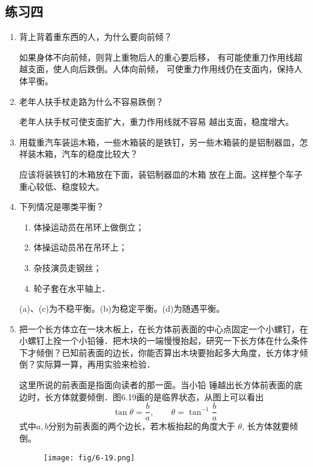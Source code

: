 \subsection{练习四}
\begin{enumerate}
    \item 背上背着重东西的人，为什么要向前倾？


    \begin{solution}
        如果身体不向前倾，则背上重物后人的重心要后移，
        有可能使重刀作用线超越支面，使人向后跌倒。人体向前倾，
        可使重力作用线仍在支面内，保持人体平衡。
    \end{solution}
    \item 老年人扶手杖走路为什么不容易跌倒？


    \begin{solution}
        老年人扶手杖可使支面扩大，重力作用线就不容易
        越出支面，稳度增大。
    \end{solution}
    \item 用载重汽车装运木箱，一些木箱装的是铁钉，另一些木箱装的是铝制器皿，怎祥装木箱，汽车的稳度比较大？


    \begin{solution}
        应该将装铁钉的木箱放在下面，装铝制器皿的木箱
        放在上面。这样整个车子重心较低、稳度较大。
    \end{solution}
    \item 下列情况是哪类平衡？
    \begin{enumerate}
        \item 体操运动员在吊环上做倒立；
        \item 体操运动员吊在吊环上；
        \item 杂技演员走钢丝；
        \item 轮子套在水平轴上．
    \end{enumerate}


    \begin{solution}
       (a)、(c)为不稳平衡。(b)为稳定平衡。(d)为随遇平衡。
    \end{solution}
    \item 把一个长方体立在一块木板上，在长方体前表面的中心点固定一个小螺钉，在小螺钉上拴一个小铅锤．把木块的一端慢慢抬起，研究一下长方体在什么条件下才倾倒？已知前表面的边长，你能否算出木块要抬起多大角度，长方体才倾倒？实际算一算，再用实验来检验．


    \begin{solution}
        这里所说的前表面是指面向读者的那一面。当小铅
        锤越出长方体前表面的底边时，长方体就要倾倒．图6.19画的是临界状态，从图上可以看出
\[\tan\theta=\frac{b}{a},\qquad \theta=\tan^{-1}\frac{b}{a}\]
        式中$a,b$分别为前表面的两个边长，若木板抬起的角度大于
        $\theta$, 长方体就要倾倒。
    \end{solution}
    \begin{figure}[htp]
        \centering    \texttt{[image: fig/6-19.png]}
        \caption{}
        \end{figure}
\end{enumerate}












